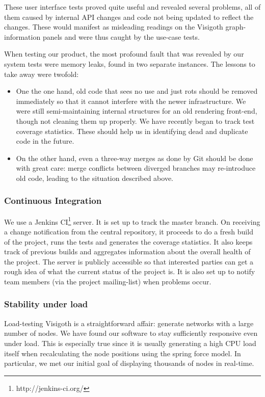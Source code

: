 \documentclass[a4paper,11pt,titlepage]{article}
\begin{document}
These user interface tests proved quite useful and revealed several
problems, all of them caused by internal API changes and code not
being updated to reflect the changes. These would manifest as
misleading readings on the Visigoth graph-information panels and
were thus caught by the use-case tests.

When testing our product, the most profound fault that was revealed
by our system tests were memory leaks, found in two separate
instances. The lessons to take away were twofold:
\begin{itemize}
  \item One the one hand, old code that sees no use and just rots
        should be removed immediately so that it cannot interfere
        with the newer infrastructure. We were still semi-maintaining
        internal structures for an old rendering front-end, though
        not cleaning them up properly. We have recently began to
        track test coverage statistics. These should help us in
        identifying dead and duplicate code in the future.
  \item On the other hand, even a three-way merges as done by Git
        should be done with great care: merge conflicts between
        diverged branches may re-introduce old code, leading to
        the situation described above.
\end{itemize}

\subsubsection{Continuous Integration}
We use a Jenkins CI\footnote{http://jenkins-ci.org/} server. It is
set up to track the master branch. On receiving a change notification
from the central repository, it proceeds to do a fresh build of the
project, runs the tests and generates the coverage statistics. It
also keeps track of previous builds and aggregates information about
the overall health of the project.
The server is publicly accessible so that interested parties can get
a rough idea of what the current status of the project is. It is also
set up to notify team members (via the project mailing-list) when
problems occur.

\subsubsection{Stability under load}
Load-testing Visigoth is a straightforward affair: generate networks
with a large number of nodes. We have found our software to stay
sufficiently responsive even under load. This is especially true
since it is usually generating a high CPU load itself when
recalculating the node positions using the spring force model. In
particular, we met our initial goal of displaying thousands of nodes
in real-time.
\end{document}
